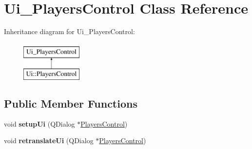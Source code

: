 \hypertarget{classUi__PlayersControl}{\section{Ui\-\_\-\-Players\-Control Class Reference}
\label{classUi__PlayersControl}
}
Inheritance diagram for Ui\-\_\-\-Players\-Control\-:\begin{figure}[H]
\begin{center}
\leavevmode
\includegraphics[height=2.000000cm]{classUi__PlayersControl}
\end{center}
\end{figure}
\subsection*{Public Member Functions}
\begin{DoxyCompactItemize}
\item 
\hypertarget{classUi__PlayersControl_a6acf9aeb42d67b31fc6e0bf5acf83539}{void {\bfseries setup\-Ui} (Q\-Dialog $\ast$\hyperlink{classPlayersControl}{Players\-Control})}\label{classUi__PlayersControl_a6acf9aeb42d67b31fc6e0bf5acf83539}

\item 
\hypertarget{classUi__PlayersControl_a8d9e5d1a31b87bfa71b6f5c8b0e0cbf9}{void {\bfseries retranslate\-Ui} (Q\-Dialog $\ast$\hyperlink{classPlayersControl}{Players\-Control})}\label{classUi__PlayersControl_a8d9e5d1a31b87bfa71b6f5c8b0e0cbf9}

\end{DoxyCompactItemize}
